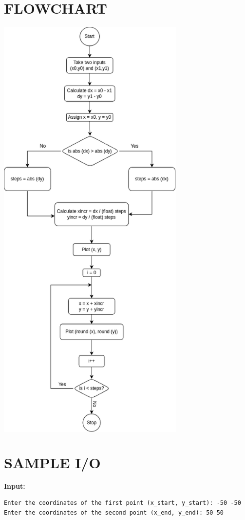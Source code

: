 \documentclass{article}
\begin{document}
\section*{FLOWCHART}
\begin{center}
\includegraphics[width=0.7\textwidth]{flowchart.png}
\end{center}

\newpage

\section*{SAMPLE I/O}
\textbf{Input:}
\begin{verbatim}
Enter the coordinates of the first point (x_start, y_start): -50 -50
Enter the coordinates of the second point (x_end, y_end): 50 50
\end{verbatim}
\end{document}
